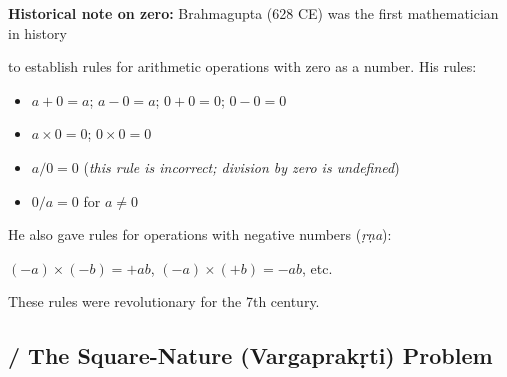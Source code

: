 \documentclass[10pt,a4paper]{article}
\newenvironment{engcommentary}
\newcommand{\bilingualverse}[2]{%

\noindent\begin{minipage}[t]{0.47\textwidth}

\dev{#1}

\end{minipage}%

\hfill\vline\hfill%

\begin{minipage}[t]{0.47\textwidth}

#2

\end{minipage}\par\vspace{0.8em}%

}
\begin{document}
\vspace{1.5em}



\begin{engcommentary}

\textbf{Historical note on zero:} Brahmagupta (628 CE) was the first mathematician in history

to establish rules for arithmetic operations with zero as a number. His rules:

\begin{itemize}

\item $a + 0 = a$; $a - 0 = a$; $0 + 0 = 0$; $0 - 0 = 0$

\item $a \times 0 = 0$; $0 \times 0 = 0$

\item $a / 0 = 0$ (\textit{this rule is incorrect; division by zero is undefined})

\item $0 / a = 0$ for $a \neq 0$

\end{itemize}

He also gave rules for operations with negative numbers (\textit{ṛṇa}):

$(-a) \times (-b) = +ab$, $(-a) \times (+b) = -ab$, etc.

These rules were revolutionary for the 7th century.

\end{engcommentary}



\subsection*{ / The Square-Nature (Vargaprakṛti) Problem}






\end{document}

